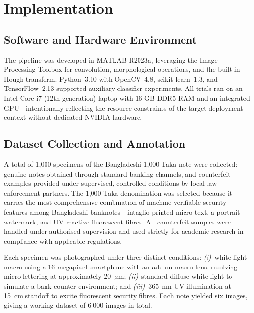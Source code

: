 \documentclass[10pt,a4paper,twocolumn,twoside]{article}
\begin{document}
\section{Implementation}
\label{sec:implementation}

\subsection{Software and Hardware Environment}

The pipeline was developed in MATLAB R2023a, leveraging the Image
Processing Toolbox for convolution, morphological operations, and
the built-in Hough transform. Python~3.10 with OpenCV~4.8,
scikit-learn~1.3, and TensorFlow~2.13 supported auxiliary
classifier experiments. All trials ran on an Intel Core i7
(12th-generation) laptop with 16 GB DDR5 RAM and an integrated
GPU---intentionally reflecting the resource constraints of the
target deployment context without dedicated NVIDIA hardware.

\subsection{Dataset Collection and Annotation}

A total of 1,000 specimens of the Bangladeshi 1{,}000 Taka note were
collected: genuine notes obtained through standard banking channels, and
counterfeit examples provided under supervised, controlled conditions by
local law enforcement partners. The 1,000 Taka denomination was selected
because it carries the most comprehensive combination of machine-verifiable
security features among Bangladeshi banknotes---intaglio-printed micro-text,
a portrait watermark, and UV-reactive fluorescent fibres. All counterfeit
samples were handled under authorised supervision and used strictly for
academic research in compliance with applicable regulations.

Each specimen was photographed under three distinct conditions:
\textit{(i)}~white-light macro using a 16-megapixel smartphone
with an add-on macro lens, resolving micro-lettering at approximately
20~$\mu$m; \textit{(ii)}~standard diffuse white-light to simulate
a bank-counter environment; and \textit{(iii)}~365~nm UV illumination
at 15~cm standoff to excite fluorescent security fibres. Each note
yielded six images, giving a working dataset of 6{,}000 images in total.
\end{document}
